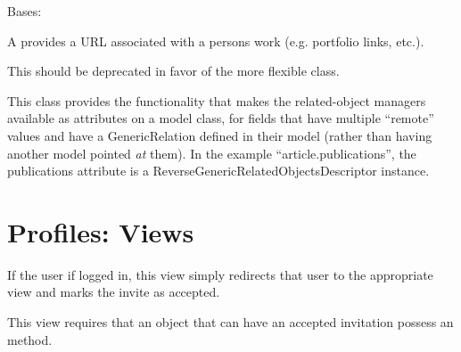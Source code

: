 \documentclass[letterpaper,10pt,english]{sphinxmanual}
\begin{document}

\begin{fulllineitems}
\label{generated/apps.profiles.models:apps.profiles.models.WorkURL}
Bases: {\hyperref[generated/apps.profiles.models:apps.profiles.models.BaseModel]{}}

A  provides a URL associated with a persons work
(e.g. portfolio links, etc.).

This should be deprecated in favor of the more flexible
 class.


\begin{fulllineitems}
\label{generated/apps.profiles.models:apps.profiles.models.WorkURL.unit_permissions}
This class provides the functionality that makes the related-object
managers available as attributes on a model class, for fields that have
multiple ``remote'' values and have a GenericRelation defined in their model
(rather than having another model pointed \emph{at} them). In the example
``article.publications'', the publications attribute is a
ReverseGenericRelatedObjectsDescriptor instance.

\end{fulllineitems}


\end{fulllineitems}



\chapter{Profiles: Views}
\label{generated/apps.profiles.views:module-apps.profiles.views}\label{generated/apps.profiles.views::doc}\label{generated/apps.profiles.views:profiles-views}

\begin{fulllineitems}
\label{generated/apps.profiles.views:apps.profiles.views.accept_invitation}
If the user if logged in, this view simply redirects that user to the
appropriate view and marks the invite as accepted.

This view requires that an object that can have an accepted invitation
possess an  method.

\end{fulllineitems}
\end{document}
